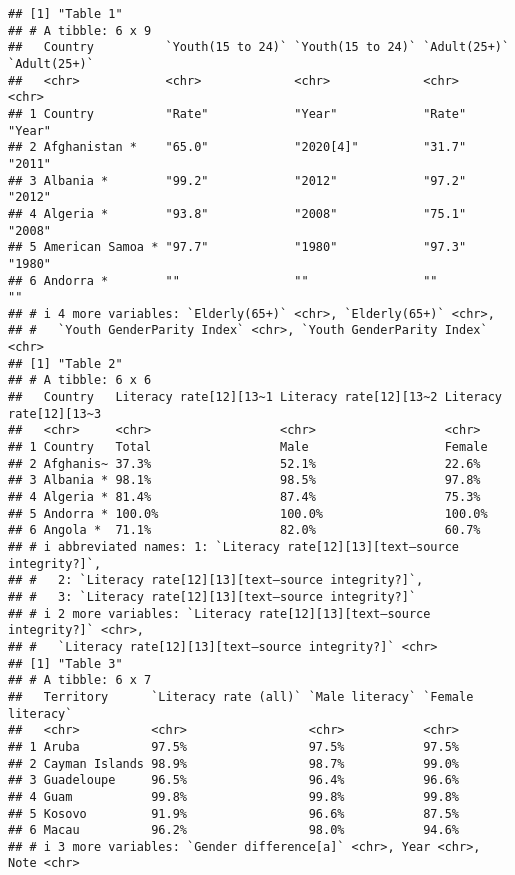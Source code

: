 \documentclass[
]{article}
\begin{document}
\begin{verbatim}
## [1] "Table 1"
## # A tibble: 6 x 9
##   Country          `Youth(15 to 24)` `Youth(15 to 24)` `Adult(25+)` `Adult(25+)`
##   <chr>            <chr>             <chr>             <chr>        <chr>       
## 1 Country          "Rate"            "Year"            "Rate"       "Year"      
## 2 Afghanistan *    "65.0"            "2020[4]"         "31.7"       "2011"      
## 3 Albania *        "99.2"            "2012"            "97.2"       "2012"      
## 4 Algeria *        "93.8"            "2008"            "75.1"       "2008"      
## 5 American Samoa * "97.7"            "1980"            "97.3"       "1980"      
## 6 Andorra *        ""                ""                ""           ""          
## # i 4 more variables: `Elderly(65+)` <chr>, `Elderly(65+)` <chr>,
## #   `Youth GenderParity Index` <chr>, `Youth GenderParity Index` <chr>
## [1] "Table 2"
## # A tibble: 6 x 6
##   Country   Literacy rate[12][13~1 Literacy rate[12][13~2 Literacy rate[12][13~3
##   <chr>     <chr>                  <chr>                  <chr>                 
## 1 Country   Total                  Male                   Female                
## 2 Afghanis~ 37.3%                  52.1%                  22.6%                 
## 3 Albania * 98.1%                  98.5%                  97.8%                 
## 4 Algeria * 81.4%                  87.4%                  75.3%                 
## 5 Andorra * 100.0%                 100.0%                 100.0%                
## 6 Angola *  71.1%                  82.0%                  60.7%                 
## # i abbreviated names: 1: `Literacy rate[12][13][text–source integrity?]`,
## #   2: `Literacy rate[12][13][text–source integrity?]`,
## #   3: `Literacy rate[12][13][text–source integrity?]`
## # i 2 more variables: `Literacy rate[12][13][text–source integrity?]` <chr>,
## #   `Literacy rate[12][13][text–source integrity?]` <chr>
## [1] "Table 3"
## # A tibble: 6 x 7
##   Territory      `Literacy rate (all)` `Male literacy` `Female literacy`
##   <chr>          <chr>                 <chr>           <chr>            
## 1 Aruba          97.5%                 97.5%           97.5%            
## 2 Cayman Islands 98.9%                 98.7%           99.0%            
## 3 Guadeloupe     96.5%                 96.4%           96.6%            
## 4 Guam           99.8%                 99.8%           99.8%            
## 5 Kosovo         91.9%                 96.6%           87.5%            
## 6 Macau          96.2%                 98.0%           94.6%            
## # i 3 more variables: `Gender difference[a]` <chr>, Year <chr>, Note <chr>
\end{verbatim}
\end{document}
